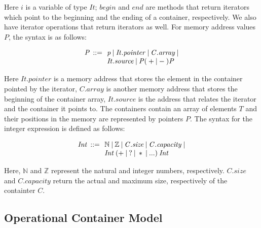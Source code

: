 \documentclass[conference]{IEEEtran}
\begin{document}
\noindent
Here $\mathit{i}$ is a variable of type $\mathit{It}$;
$\mathit{begin}$ and $\mathit{end}$ are methods
that return iterators which point to the beginning
and the ending of a container, respectively. We also have
iterator operations that return iterators as well.
For memory address values $P$, the syntax is as follows:

\[\begin{array}{r@{\:\:}c@{\:\:}l}\label{pointer-semantics}
\mathit{P}  & ::= & \: \mathit{p} \: | \: \mathit{It.pointer} \: | \: \mathit{C.array} \: | \\
            &     & \: \mathit{It.source} \: | \: \mathit{P}  ( \: + \: | \: - \: )  \textit{P} \: \\
\end{array}
\]

\noindent
Here $\mathit{It.pointer}$ is a memory address that stores the element
in the container pointed by the iterator, $\mathit{C.array}$ is another
memory address that stores the beginning of the container array,
$\mathit{It.source}$ is the address that relates the iterator
and the container it points to.
The containers contain an array of elements $\mathit{T}$ and their
positions in the memory are represented by pointers $\mathit{P}$.
The syntax for the integer expression is defined as follows:

\[\begin{array}{r@{\:\:}c@{\:\:}l}
\mathit{Int}  & ::= & \: \mathbb{N} \: | \: \mathbb{Z} \: | \: \mathit{C.size} \: | \: \mathit{C.capacity} \: | \\
              &     & \: \mathit{Int} \: ( + \: | \: ? \: | \: * \: | \: ...) \: \mathit{Int}  \: 
\end{array}
\]

\noindent
Here, $\mathbb{N}$ and $\mathbb{Z}$ represent the natural 
and integer numbers, respectively. $\mathit{C.size}$ and $\mathit{C.capacity}$ 
return the actual and maximum size, respectively of the containter $C$.


\subsection{Operational Container Model}
\end{document}
